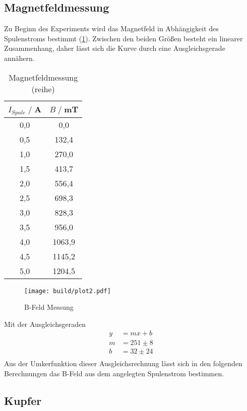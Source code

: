 \subsection{Magnetfeldmessung}
Zu Beginn des Experiments wird das Magnetfeld in Abhängigkeit des Spulenstroms bestimmt (\ref{tab:Br}).
Zwischen den beiden Größen besteht ein linearer Zusammenhang, daher lässt sich die Kurve durch eine Ausgleichsgerade annähern.
\begin{table}[H]
    \centering
    \begin{tabular}{c c}
        \toprule
        $I_{Spule} \;/\;$A & $B\;/\;$mT\\
        \midrule
        0,0                 &0,0\\
        0,5                 &132,4\\
        1,0                 &270,0\\
        1,5                 &413,7\\
        2,0                 &556,4\\  
        2,5                 &698,3\\
        3,0                 &828,3\\
        3,5                 &956,0\\
        4,0                 &1063,9\\
        4,5                 &1145,2\\
        5,0                 &1204,5\\
        \bottomrule
    \end{tabular}
    \caption{Magnetfeldmessung (reihe)}
    \label{tab:Br}
\end{table}
\begin{figure}[H]
    \centering
    \texttt{[image: build/plot2.pdf]}
    \caption{B-Feld Messung}
    \label{fig:Br}
\end{figure}
Mit der Ausgleichsgeraden
\begin{align*}
    y &= mx + b\\
    m &= 251\pm 8\\  
    b &= 32\pm 24\\
\end{align*}
Aus der Umkerfunktion dieser Ausgleichsrechnung lässt sich in den folgenden Berechnungen das B-Feld aus dem angelegten Spulenstrom bestimmen.


\subsection{Kupfer}
